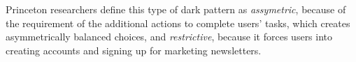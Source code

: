     Princeton researchers define this type of dark pattern as \emph{assymetric}, because of the requirement of the additional actions to complete users' tasks, which creates asymmetrically balanced choices, and \emph{restrictive}, because it forces users into creating accounts and signing up for marketing newsletters.
